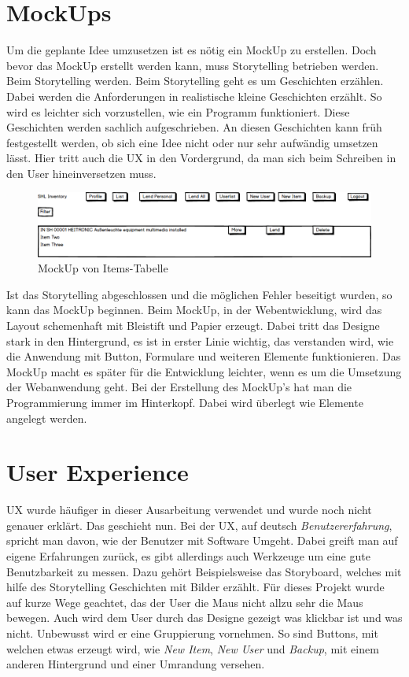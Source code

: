 \section{MockUps}
Um die geplante Idee umzusetzen ist es nötig ein MockUp zu erstellen. Doch bevor das MockUp erstellt werden kann, muss Storytelling betrieben werden. Beim Storytelling werden. Beim Storytelling geht es um Geschichten erzählen. Dabei werden die Anforderungen in realistische kleine Geschichten erzählt. So wird es leichter sich vorzustellen, wie ein Programm funktioniert. Diese Geschichten werden sachlich aufgeschrieben. An diesen Geschichten kann früh festgestellt werden, ob sich eine Idee nicht oder nur sehr aufwändig umsetzen lässt. Hier tritt auch die \acl{UX} in den Vordergrund, da man sich beim Schreiben in den User hineinversetzen muss. \autocite{Schach.2017}


\begin{figure}[bh]
	\centering
	\includegraphics[scale=0.3]{content/pictures/MockUp.png}
	\caption{MockUp von Items-Tabelle}
	\label{fig:mockup}
\end{figure}


Ist das Storytelling abgeschlossen und die möglichen Fehler beseitigt wurden, so kann das MockUp beginnen. Beim MockUp, in der Webentwicklung, wird das Layout schemenhaft mit Bleistift und Papier erzeugt. Dabei tritt das Designe stark in den Hintergrund, es ist in erster Linie wichtig, das verstanden wird, wie die Anwendung mit Button, Formulare und weiteren Elemente funktionieren. Das MockUp macht es später für die Entwicklung leichter, wenn es um die Umsetzung der Webanwendung geht. Bei der Erstellung des MockUp's hat man die Programmierung immer im Hinterkopf. Dabei wird überlegt wie Elemente angelegt werden.

\newpage

\section{User Experience}
\acf{UX} wurde häufiger in dieser Ausarbeitung verwendet und wurde noch nicht genauer erklärt. Das geschieht nun. Bei der \acl{UX}, auf deutsch \textit{Benutzererfahrung}, spricht man davon, wie der Benutzer mit Software Umgeht. Dabei greift man auf eigene Erfahrungen zurück, es gibt allerdings auch Werkzeuge um eine gute Benutzbarkeit zu messen. \autocite{Moser.2012} Dazu gehört Beispielsweise das Storyboard, welches mit hilfe des Storytelling Geschichten mit Bilder erzählt. Für dieses Projekt wurde auf kurze Wege geachtet, das der User die Maus nicht allzu sehr die Maus bewegen. Auch wird dem User durch das Designe gezeigt was klickbar ist und was nicht. Unbewusst wird er eine Gruppierung vornehmen. So sind Buttons, mit welchen etwas erzeugt wird, wie \textit{New Item}, \textit{New User} und \textit{Backup}, mit einem anderen Hintergrund und einer Umrandung versehen. 

